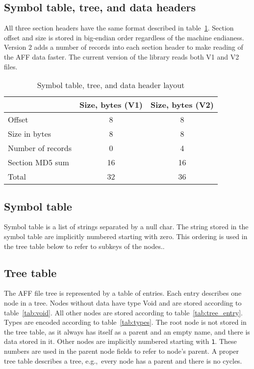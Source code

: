 \documentclass[10pt,letterpaper]{article}
\newcommand{\bc}{\begin{center}}
\newcommand{\ec}{\end{center}}
\newcommand{\ctext}[1]{\texttt{#1}}         %
\begin{document}
\subsection{Symbol table, tree, and data headers}
All three section headers have the same format described in
table~\ref{tab:shdr}. Section offset and size is stored in big-endian order
regardless of the machine endianess.
Version 2 adds a number of records into each section header to make reading
of the AFF data faster. The current version of the library reads both V1 and V2
files.
\begin{table}[h]
\bc
\caption{Symbol table, tree, and data header layout}\label{tab:shdr}
\begin{tabular}{|l|c|c|} \hline
 & Size, bytes (V1) & Size, bytes (V2) \\ \hline\hline
Offset  & 8 & 8\\ \hline
Size in bytes & 8 & 8\\ \hline
Number of records & 0 & 4\\ \hline
Section MD5 sum & 16 & 16 \\ \hline
Total & 32 & 36 \\ \hline
\end{tabular}
\ec
\end{table}

\subsection{Symbol table}
Symbol table is a list of strings separated by a null char. The string stored in the symbol table are implicitly numbered starting with zero. This ordering is used in the tree table below to refer to subkeys of the nodes..

\subsection{Tree table}
The AFF file tree is represented by a table of entries. Each entry describes one node in a tree. Nodes without data have type Void and are stored according to table~\ref{tab:void}. All other nodes are stored according to table~\ref{tab:tree_entry}. Types are encoded according to table~\ref{tab:types}. The root node is not stored in the tree table, as it always has itself as a parent and an empty name, and there is data stored in it. Other nodes are implicitly numbered starting with \ctext{1}. These numbers are used in the parent node fields to refer to node's parent. A proper tree table describes a tree, e.g.,~every node has a parent and there is no cycles.
\end{document}
